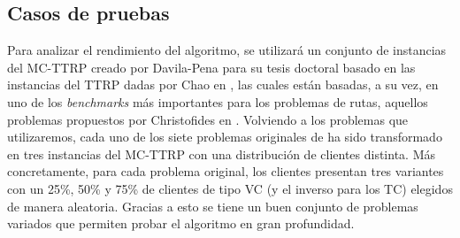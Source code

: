 \subsection{Casos de pruebas}\label{section:casos-pruebas}
Para analizar el rendimiento del algoritmo, se utilizará un conjunto de instancias del MC-TTRP creado por Davila-Pena para su tesis doctoral \cite{laura-mcttrp} basado en las instancias del TTRP dadas por Chao en \cite{chao-ttrp}, las cuales están basadas, a su vez, en uno de los \textit{benchmarks} más importantes para los problemas de rutas, aquellos problemas propuestos por Christofides en \cite{Christofides1976}. Volviendo a los problemas que utilizaremos, cada uno de los siete problemas originales de \cite{Christofides1976} ha sido transformado en tres instancias del MC-TTRP con una distribución de clientes distinta. Más concretamente, para cada problema original, los clientes presentan tres variantes con un 25\%, 50\% y 75\% de clientes de tipo VC (y el inverso para los TC) elegidos de manera aleatoria. Gracias a esto se tiene un buen conjunto de problemas variados que permiten probar el algoritmo en gran profundidad.\\

